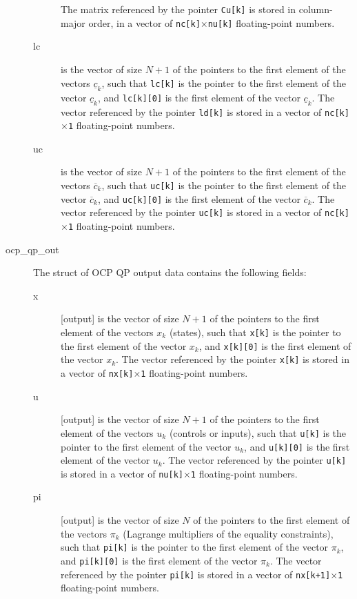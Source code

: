 \documentclass{report}
\begin{document}
\begin{description}
\begin{description}
		The matrix referenced by the pointer \texttt{Cu[k]} is stored in column-major order, in a vector of \texttt{nc[k]$\times$nu[k]} floating-point numbers.
		\item[lc] is the vector of size $N+1$ of the pointers to the first element of the vectors $\underline c_k$, such that \texttt{lc[k]} is the pointer to the first element of the vector $\underline c_k$, and \texttt{lc[k][0]} is the first element of the vector $\underline c_k$.
		The vector referenced by the pointer \texttt{ld[k]} is stored in a vector of \texttt{nc[k]$\times$1} floating-point numbers.
		\item[uc] is the vector of size $N+1$ of the pointers to the first element of the vectors $\overline c_k$, such that \texttt{uc[k]} is the pointer to the first element of the vector $\overline c_k$, and \texttt{uc[k][0]} is the first element of the vector $\overline c_k$.
		The vector referenced by the pointer \texttt{uc[k]} is stored in a vector of \texttt{nc[k]$\times$1} floating-point numbers.
	\end{description}
	\item[ocp\_qp\_out] The struct of OCP QP output data contains the following fields:
	\begin{description}
		\item[x] [output] is the vector of size $N+1$ of the pointers to the first element of the vectors $x_k$ (states), such that \texttt{x[k]} is the pointer to the first element of the vector $x_k$, and \texttt{x[k][0]} is the first element of the vector $x_k$.
		The vector referenced by the pointer \texttt{x[k]} is stored in a vector of \texttt{nx[k]$\times$1} floating-point numbers.
		\item[u] [output] is the vector of size $N+1$ of the pointers to the first element of the vectors $u_k$ (controls or inputs), such that \texttt{u[k]} is the pointer to the first element of the vector $u_k$, and \texttt{u[k][0]} is the first element of the vector $u_k$.
		The vector referenced by the pointer \texttt{u[k]} is stored in a vector of \texttt{nu[k]$\times$1} floating-point numbers.
		\item[pi] [output] is the vector of size $N$ of the pointers to the first element of the vectors $\pi_k$ (Lagrange multipliers of the equality constraints), such that \texttt{pi[k]} is the pointer to the first element of the vector $\pi_k$, and \texttt{pi[k][0]} is the first element of the vector $\pi_k$.
		The vector referenced by the pointer \texttt{pi[k]} is stored in a vector of \texttt{nx[k+1]$\times$1} floating-point numbers.

\end{description}
\end{description}
\end{document}
